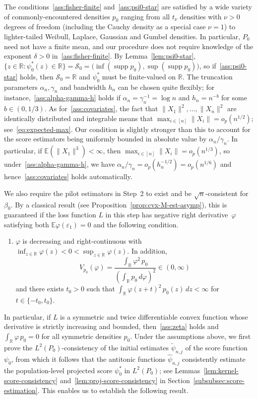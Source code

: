\documentclass[a4paper]{article}
\newcommand{\R}{\mathbb{R}}
\newcommand{\E}{\mathbb{E}}
\newcommand{\norm}[1]{\|{#1}\|}
\DeclareMathOperator{\supp}{supp}
\theoremstyle{definition}
\begin{document}
The conditions~\ref{ass:fisher-finite} and~\ref{ass:psi0-star} 
are satisfied by a wide variety of commonly-encountered densities $p_0$ ranging from all $t_\nu$ densities with $\nu > 0$ degrees of freedom (including the Cauchy density as a special case $\nu = 1$) to lighter-tailed Weibull, Laplace, Gaussian and Gumbel densities. In particular, $P_0$ need not have a finite mean, and our procedure does not require knowledge of the exponent $\delta > 0$ in~\ref{ass:fisher-finite}. By Lemma~\ref{lem:psi0-star}, $\{z \in \R : \psi_0^*(z) \in \R\} = \mathcal{S}_0 = \bigl(\inf(\supp p_0), \sup(\supp p_0)\bigr)$, so if~\ref{ass:psi0-star} holds, then $\mathcal{S}_0 = \R$ and $\psi_0^*$ must be finite-valued on $\R$. The truncation parameters $\alpha_n,\gamma_n$ and bandwidth $h_n$ can be chosen quite flexibly; for instance,~\ref{ass:alpha-gamma-h} holds if $\alpha_n = \gamma_n^{-1} = \log n$ and $h_n = n^{-b}$ for some $b \in (0,1/3)$. As for~\ref{ass:covariates}, the fact that $\norm{X_1}^2,\dotsc,\norm{X_n}^2$ are identically distributed and integrable means that $\max_{i \in [n]}\norm{X_i} = o_p(n^{1/2})$; see~\eqref{eq:expected-max}. Our condition is slightly stronger than this to account for the score estimators being uniformly bounded in absolute value by $\alpha_n/\gamma_n$. In particular, if $\E(\norm{X_1}^3) < \infty$, then $\max_{i \in [n]}\norm{X_i} = o_p(n^{1/3})$, so under~\ref{ass:alpha-gamma-h}, we have $\alpha_n/\gamma_n = o_p(h_n^{-1/2}) = o_p(n^{1/6})$ and hence~\ref{ass:covariates} holds automatically.

We also require the pilot estimators in Step~2 to exist and be $\sqrt{n}$-consistent for $\beta_0$. By a classical result (see Proposition~\ref{prop:cvx-M-est-asymp}), this is guaranteed if the loss function $L$ in this step has negative right derivative~$\varphi$ satisfying both $\E\varphi(\varepsilon_1) = 0$ and the following condition.

\begin{enumerate}[label=(B)]
\item \label{ass:zeta} $\varphi$ is decreasing and right-continuous with $\inf_{z \in \R}\varphi(z) < 0 < \sup_{z \in \R}\varphi(z)$. In addition,
\[
V_{p_0}(\varphi) = \frac{\int_\R \varphi^2\,p_0}{(\int_\R p_0\,d\varphi)^2} \in (0,\infty)
\]
and there exists $t_0 > 0$ such that $\int_\R \varphi(z + t)^2\,p_0(z)\,dz < \infty$ for $t \in \{-t_0,t_0\}$.
\end{enumerate}
In particular, if $L$ is a symmetric and twice differentiable convex function whose derivative is strictly increasing and bounded, then~\ref{ass:zeta} holds and $\int_\R \varphi\,p_0 = 0$ for all symmetric densities $p_0$.  Under the assumptions above, we first prove the $L^2(P_0)$-consistency of the initial estimates $\tilde{\psi}_{n,j}$ of the score function $\psi_0$, from which it follows that the antitonic functions $\hat{\psi}_{n,j}$ consistently estimate the population-level projected score $\psi_0^*$ in $L^2(P_0)$; see Lemmas~\ref{lem:kernel-score-consistency} and~\ref{lem:proj-score-consistency} in Section~\ref{subsubsec:score-estimation}. This enables us to establish the following result.
\end{document}
